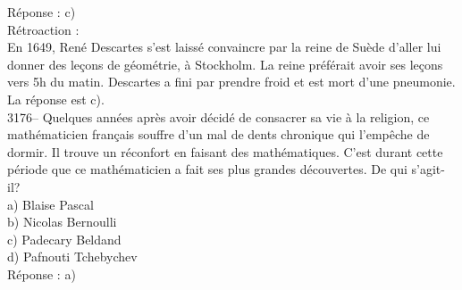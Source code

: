 \documentclass[letterpaper, 12pt]{article}
\begin{document}
R\'eponse : c)\\

R\'etroaction :\\
En 1649, Ren\'e Descartes s'est laiss\'e convaincre par la reine de Su\`ede d'aller lui donner des le\c cons de g\'eom\'etrie, \`a Stockholm. La reine pr\'ef\'erait avoir ses le\c cons vers 5h du matin. Descartes a fini par prendre froid et est mort d'une pneumonie. La r\'eponse est c).\\



3176-- Quelques ann\'ees apr\`es avoir d\'ecid\'e de consacrer sa vie \`a la religion, ce math\'ematicien fran\c cais souffre d'un mal de dents chronique qui l'emp\^eche de dormir. Il trouve un r\'econfort en faisant des math\'ematiques. C'est durant cette p\'eriode que ce math\'ematicien a fait ses plus grandes d\'ecouvertes. De qui s'agit-il?\\

a) Blaise Pascal\\
b) Nicolas Bernoulli\\
c) Padecary Beldand\\
d) Pafnouti Tchebychev\\

R\'eponse : a)\\
\end{document}
